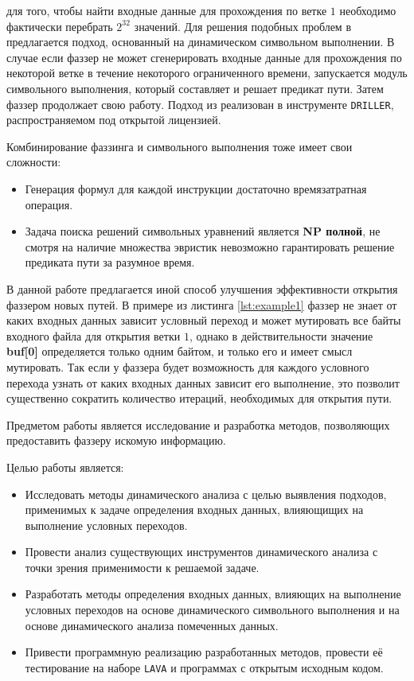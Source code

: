 для того, чтобы найти входные данные для прохождения по ветке $1$ необходимо фактически перебрать $2^{32}$ значений. Для решения подобных проблем в \cite{DRILLER} предлагается подход, основанный на динамическом символьном выполнении. В случае если фаззер не может сгенерировать входные данные для прохождения по некоторой ветке в течение некоторого ограниченного времени, запускается модуль символьного выполнения, который составляет и решает предикат пути. Затем фаззер продолжает свою работу.
Подход из \cite{DRILLER} реализован в инструменте \texttt{DRILLER}, распространяемом под открытой лицензией.

Комбинирование фаззинга и символьного выполнения тоже имеет свои сложности:
\begin{itemize}
    \item Генерация формул для каждой инструкции достаточно времязатратная операция.
    \item Задача поиска решений символьных уравнений является \textbf{NP полной}, не смотря на наличие множества эвристик невозможно гарантировать решение предиката пути за разумное время.
\end{itemize}

В данной работе предлагается иной способ улучшения эффективности открытия фаззером новых путей. В примере из листинга \ref{lst:example1} фаззер не знает от каких входных данных зависит условный переход и может мутировать все байты входного файла для открытия ветки $1$, однако в действительности значение \textbf{buf[0]} определяется только одним байтом, и только его и имеет смысл мутировать.
Так если у фаззера будет возможность для каждого условного перехода узнать от каких входных данных зависит его выполнение, это позволит существенно сократить количество итераций, необходимых для открытия пути.

Предметом работы является исследование и разработка методов, позволяющих предоставить фаззеру искомую информацию.

Целью работы является:
\begin{itemize}
    \item Исследовать методы динамического анализа с целью выявления подходов, применимых к задаче определения входных данных, влияющищих на выполнение условных переходов.
    \item Провести анализ существующих инструментов динамического анализа с точки зрения применимости к решаемой задаче.
    \item Разработать методы определения входных данных, влияющих на выполнение условных переходов на основе динамического символьного выполнения и на основе динамического анализа помеченных данных.
    \item Привести программную реализацию разработанных методов, провести её тестирование на наборе \texttt{LAVA} и программах с открытым исходным кодом.
\end{itemize}


